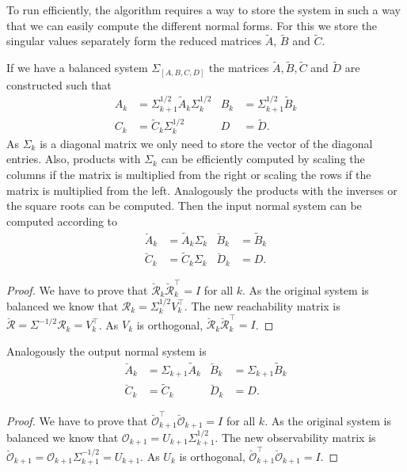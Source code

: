 \documentclass[numbers=noenddot,doctype=mastersthesis,BCOR=15mm,biblatex]{ldvbook}%
\newcommand{\R}{\mathcal{R}} %
\newcommand{\Ob}{\mathcal{O}} %
\newcommand{\eye}{I} %
\begin{document}
To run efficiently, the algorithm requires a way to store the system in such a way that we can easily compute the different normal forms.
For this we store the singular values separately form the reduced matrices $\tilde{A}$, $\tilde{B}$ and $\tilde{C}$.

If we have a balanced system $\Sigma_{[A,B,C,D]}$ the matrices $\tilde{A},\tilde{B},\tilde{C}$ and $\tilde{D}$ are constructed such that 
\begin{subequations}
	\begin{align}
	A_k &= \Sigma_{k+1}^{1/2} \tilde{A}_k \Sigma_k^{1/2} &
	B_k &= \Sigma_{k+1}^{1/2} \tilde{B}_k \\
	C_k &= \tilde{C}_k \Sigma_k^{1/2} & 
	D&=\tilde{D}
	.
	\end{align}\label{eq:stages_sigma}
\end{subequations}
As $\Sigma_k$ is a diagonal matrix we only need to store the vector of the diagonal entries.
Also, products with $\Sigma_k$ can be efficiently computed by scaling the columns if the matrix is multiplied from the right or scaling the rows if the matrix is multiplied from the left.
Analogously the products with the inverses or the square roots can be computed.
Then the input normal system can be computed according to
\begin{subequations}
	\begin{align}
	\breve{A}_k &=  \tilde{A}_k \Sigma_k &
	\breve{B}_k &=  \tilde{B}_k \\
	\breve{C}_k &= \tilde{C}_k \Sigma_k & 
	\breve{D}_k &= D
	.
	\end{align}
\end{subequations}
\begin{proof}
	We have to prove that $\breve{\R}_k \breve{\R}_k^\top = \eye$ for all $k$.
	As the original system is balanced we know that $\R_k = \Sigma_k^{1/2} V_k^\top$.
	The new reachability matrix is $\breve{\R} = \Sigma^{-1/2} \R_{k} = V_k^\top$.
	As $V_k$ is orthogonal, $\breve{\R}_k \breve{\R}_k^\top = \eye$.
\end{proof}
Analogously the output normal system is
\begin{subequations}
	\begin{align}
	\breve{A}_k &= \Sigma_{k+1} \tilde{A}_k  &
	\breve{B}_k &= \Sigma_{k+1} \tilde{B}_k \\
	\breve{C}_k &= \tilde{C}_k  & 
	\breve{D}_k &=D
	.
	\end{align}
\end{subequations}
\begin{proof}
	We have to prove that $\breve{\Ob}_{k+1}^\top \breve{\Ob}_{k+1} = \eye$ for all $k$.
	As the original system is balanced we know that $\Ob_{k+1} = U_{k+1} \Sigma_{k+1}^{1/2}$.
	The new observability matrix is $\breve{\Ob}_{k+1} = \Ob_{k+1} \Sigma_{k+1}^{-1/2} = U_{k+1}$.
	As $U_k$ is orthogonal, $\breve{\Ob}_{k+1}^\top \breve{\Ob}_{k+1} = \eye$.
\end{proof}
\end{document}
